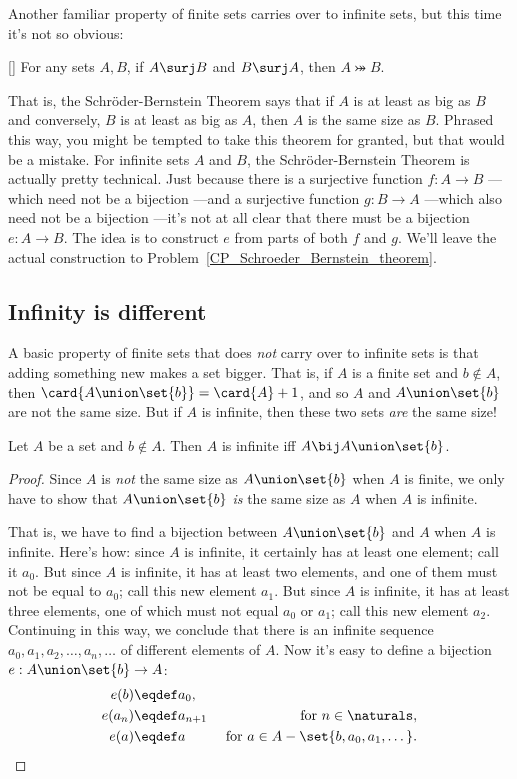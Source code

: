 Another familiar property of finite sets carries over to infinite
sets, but this time it's not so obvious:
\begin{theorem}\label{S-B_thm} \mbox{}
 [] For any sets $A,B$, if $A \surj B$ and
 $B \surj A$, then $A \bij B$.
\end{theorem}

That is, the Schr\"oder-Bernstein Theorem says that if $A$ is at least
as big as $B$ and conversely, $B$ is at least as big as $A$, then $A$
is the same size as $B$.  Phrased this way, you might be tempted to
take this theorem for granted, but that would be a mistake.  For
infinite sets $A$ and $B$, the Schr\"oder-Bernstein Theorem is
actually pretty technical.  Just because there is a surjective
function $f:A\to B$ ---which need not be a bijection ---and a
surjective function $g:B \to A$ ---which also need not be a bijection
---it's not at all clear that there must be a bijection $e:A \to B$.
The idea is to construct $e$ from parts of both $f$ and $g$.  We'll
leave the actual construction to
Problem~\ref{CP_Schroeder_Bernstein_theorem}.

\subsection{Infinity is different}

A basic property of finite sets that does \emph{not} carry over to
infinite sets is that adding something new makes a set bigger.  That
is, if $A$ is a finite set and $b \notin A$, then $\card{A \union
  \set{b}} = \card{A}+1$, and so $A$ and $A \union \set{b}$ are not
the same size.  But if $A$ is infinite, then these two sets \emph{are}
the same size!

\begin{lemma}\label{AUb}
  Let $A$ be a set and $b \notin A$.  Then $A$ is infinite iff $A \bij
  A \union \set{b}$.
\end{lemma}
\begin{proof}
  Since $A$ is \emph{not} the same size as $A \union \set{b}$ when $A$
  is finite, we only have to show that $A \union \set{b}$ \emph{is}
  the same size as $A$ when $A$ is infinite.

That is, we have to find a bijection between $A \union \set{b}$ and
$A$ when $A$ is infinite.  Here's how: since $A$ is infinite, it
certainly has at least one element; call it $a_0$.  But since $A$ is
infinite, it has at least two elements, and one of them must not be
equal to $a_0$; call this new element $a_1$.  But since $A$ is
infinite, it has at least three elements, one of which must not equal
$a_0$ or $a_1$; call this new element $a_2$.  Continuing in this way,
we conclude that there is an infinite sequence
$a_0,a_1,a_2,\dots,a_n,\dots$ of different elements of $A$.  Now it's
easy to define a bijection $e: A \union \set{b} \to A$:
\begin{align*}
e(b) & \eqdef a_0,\\ e(a_n) & \eqdef a_{n+1} &\text{ for } n \in
\naturals,\\ e(a) & \eqdef a & \text{ for } a \in A -
\set{b,a_0,a_1,\dots}.
\end{align*}
\end{proof}

